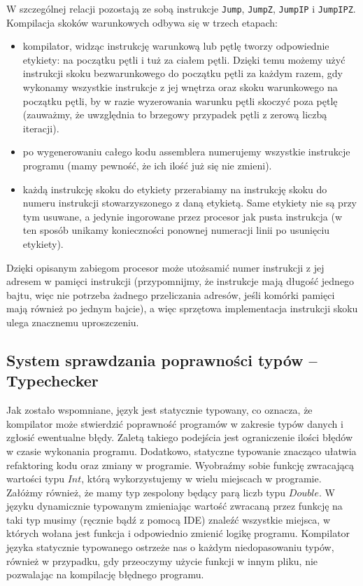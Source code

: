 W szczególnej relacji pozostają ze sobą instrukcje \texttt{Jump}, \texttt{JumpZ}, \texttt{JumpIP} i \texttt{JumpIPZ}. Kompilacja skoków warunkowych odbywa się w trzech etapach:
\begin{itemize}
  \item kompilator, widząc instrukcję warunkową lub pętlę tworzy odpowiednie etykiety: na początku pętli i tuż za ciałem pętli. Dzięki temu możemy użyć instrukcji skoku bezwarunkowego do początku pętli za każdym razem, gdy wykonamy wszystkie instrukcje z jej wnętrza oraz skoku warunkowego na początku pętli, by w razie wyzerowania warunku pętli skoczyć poza pętlę (zauważmy, że uwzględnia to brzegowy przypadek pętli z zerową liczbą iteracji).
  \item po wygenerowaniu całego kodu assemblera numerujemy wszystkie instrukcje programu (mamy pewność, że ich ilość już się nie zmieni).
  \item każdą instrukcję skoku do etykiety przerabiamy na instrukcję skoku do numeru instrukcji stowarzyszonego z daną etykietą. Same etykiety nie są przy tym usuwane, a jedynie ingorowane przez procesor jak pusta instrukcja (w ten sposób unikamy konieczności ponownej numeracji linii po usunięciu etykiety).
\end{itemize}

Dzięki opisanym zabiegom procesor może utożsamić numer instrukcji z jej adresem w pamięci instrukcji (przypomnijmy, że instrukcje mają długość jednego bajtu, więc nie potrzeba żadnego przeliczania adresów, jeśli komórki pamięci mają również po jednym bajcie), a więc sprzętowa implementacja instrukcji skoku ulega znacznemu uproszczeniu.

\subsection{System sprawdzania poprawności typów -- Typechecker}

Jak zostało wspomniane, język jest statycznie typowany, co oznacza, że kompilator może stwierdzić poprawność programów w zakresie typów danych i zgłosić ewentualne błędy. Zaletą takiego podejścia jest ograniczenie ilości błędów w czasie wykonania programu. Dodatkowo, statyczne typowanie znacząco ułatwia refaktoring kodu oraz zmiany w programie. Wyobraźmy sobie funkcję zwracającą wartości typu $Int$, którą wykorzystujemy w wielu miejscach w programie. Załóżmy również, że mamy typ zespolony będący parą liczb typu $Double$. W języku dynamicznie typowanym zmieniając wartość zwracaną przez funkcję na taki typ musimy (ręcznie bądź z pomocą IDE) znaleźć wszystkie miejsca, w których wołana jest funkcja i odpowiednio zmienić logikę programu. Kompilator języka statycznie typowanego ostrzeże nas o każdym niedopasowaniu typów, również w przypadku, gdy przeoczymy użycie funkcji w innym pliku, nie pozwalając na kompilację błędnego programu.

